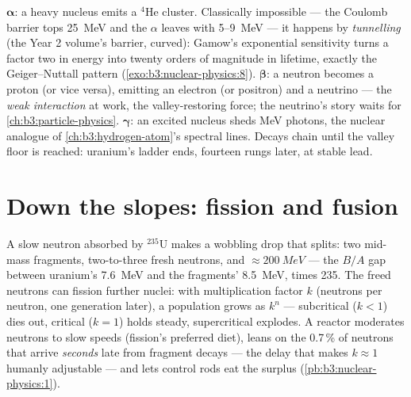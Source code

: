 \begin{remark}\label{rem:b3:nuclear-physics:modes}
$\boldsymbol\alpha$: a heavy nucleus emits a $^4$He cluster. Classically
impossible --- the Coulomb barrier tops \qty{25}{MeV} and the
$\alpha$ leaves with \qty{5}{}--\qty{9}{MeV} --- it happens by
\emph{tunnelling} (the Year 2 volume's barrier, curved): Gamow's
exponential sensitivity turns a factor two in energy into twenty
orders of magnitude in lifetime, exactly the Geiger--Nuttall
pattern (\cref{exo:b3:nuclear-physics:8}).
$\boldsymbol\beta$: a neutron becomes a proton (or vice versa), emitting
an electron (or positron) and a neutrino --- the \emph{weak
interaction} at work, the valley-restoring force; the neutrino's
story waits for \cref{ch:b3:particle-physics}.
$\boldsymbol\gamma$: an excited nucleus sheds \unit{MeV} photons, the
nuclear analogue of \cref{ch:b3:hydrogen-atom}'s spectral lines.
Decays chain until the valley floor is reached: uranium's ladder
ends, fourteen rungs later, at stable lead.
\end{remark}

\section{Down the slopes: fission and fusion}

\begin{proposition}\label{prop:b3:nuclear-physics:fission}
A slow neutron absorbed by $^{235}$U makes a wobbling drop that
splits: two mid-mass fragments, two-to-three fresh neutrons, and
$\approx\qty{200}{MeV}$ --- the $B/A$ gap between uranium's
\qty{7.6}{MeV} and the fragments' \qty{8.5}{MeV}, times 235.
The freed neutrons can fission further nuclei: with
multiplication factor $k$ (neutrons per neutron, one generation
later), a population grows as $k^n$ --- subcritical ($k < 1$)
dies out, critical ($k = 1$) holds steady, supercritical explodes.
A reactor moderates neutrons to slow speeds (fission's preferred
diet), leans on the 0.7\,\% of neutrons that arrive
\emph{seconds} late from fragment decays --- the delay that makes
$k \approx 1$ humanly adjustable --- and lets control rods eat
the surplus (\cref{pb:b3:nuclear-physics:1}).
\end{proposition}
\admitted

